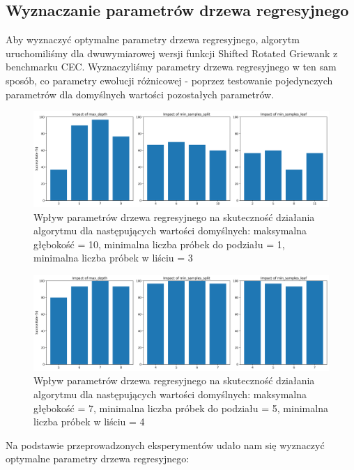 \documentclass{article}
\begin{document}
\subsection{Wyznaczanie parametrów drzewa regresyjnego}

Aby wyznaczyć optymalne parametry drzewa regresyjnego, algorytm uruchomiliśmy dla dwuwymiarowej wersji funkcji Shifted Rotated Griewank z benchmarku CEC. Wyznaczyliśmy parametry drzewa regresyjnego w ten sam sposób, co parametry ewolucji różnicowej - poprzez testowanie pojedynczych parametrów dla domyślnych wartości pozostałych parametrów.

\begin{figure}[H]
    \centering
    \includegraphics[width=\textwidth]{tree_parameter_tuning_separate_results2.png}
    \caption{Wpływ parametrów drzewa regresyjnego na skuteczność działania algorytmu dla następujących wartości domyślnych: maksymalna głębokość = 10, minimalna liczba próbek do podziału = 1, minimalna liczba próbek w liściu = 3}
    \label{fig:tree_parameter_results1}
\end{figure}

\begin{figure}[H]
    \centering
    \includegraphics[width=\textwidth]{tree_parameter_tuning_separate_results3.png}
    \caption{Wpływ parametrów drzewa regresyjnego na skuteczność działania algorytmu dla następujących wartości domyślnych: maksymalna głębokość = 7, minimalna liczba próbek do podziału = 5, minimalna liczba próbek w liściu = 4}
    \label{fig:tree_parameter_results2}
\end{figure}

Na podstawie przeprowadzonych eksperymentów udało nam się wyznaczyć optymalne parametry drzewa regresyjnego:
\end{document}
